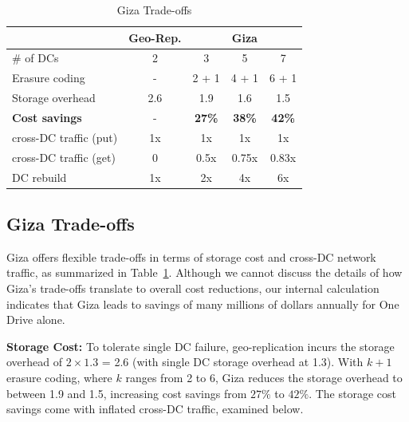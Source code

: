 \begin{table}[tp]
\centering
\footnotesize
\begin{tabular}{|l||c||c|c|c|}
\hline
											& Geo-Rep.						& \multicolumn{3}{c|}{Giza}
\\ \hline \hline
\# of DCs 						& 2										& 3 		& 5 		& 7
\\ \hline
Erasure coding 				& -										& 2 + 1	& 4 + 1	& 6 + 1
\\ \hline \hline
Storage overhead			& 2.6									& 1.9 	& 1.6 	& 1.5
\\ \hline
{\bf Cost savings}		& -										& {\bf 27\%} 	& {\bf 38\%} 	& {\bf 42\%}
\\ \hline \hline
cross-DC traffic (put)& 1x									& 1x 		& 1x 		& 1x
\\ \hline
cross-DC traffic (get)& 0										& 0.5x 	& 0.75x & 0.83x
\\ \hline
DC rebuild 						& 1x									& 2x 		& 4x 		& 6x
\\ \hline \hline
\end{tabular}
\caption{Giza Trade-offs}
\label{tab:cost_benefit}
\end{table}


\subsection{Giza Trade-offs}
\label{sec:alternative}

Giza offers flexible trade-offs in terms of storage cost and cross-DC network
traffic, as summarized in Table~\ref{tab:cost_benefit}. Although we cannot
discuss the details of how Giza's trade-offs translate to overall cost
reductions, our internal calculation indicates that Giza leads to savings of
many millions of dollars annually for One Drive alone.

{\bf Storage Cost:} To tolerate single DC failure, geo-replication incurs the
storage overhead of $2\times1.3$ = 2.6 (with single DC storage overhead at 1.3).
With $k+1$ erasure coding, where $k$ ranges from 2 to 6, Giza reduces the
storage overhead to between 1.9 and 1.5, increasing cost savings from $27\%$ to
$42\%$. The storage cost savings come with inflated cross-DC traffic, examined
below.

